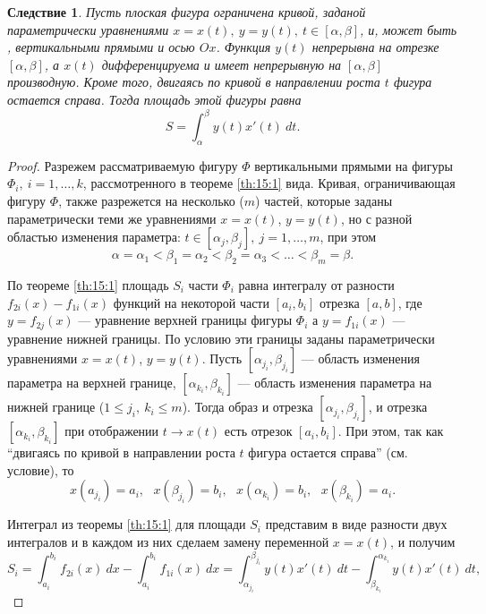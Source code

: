 \documentclass[12pt]{report}
\numberwithin{equation}{section}
\newtheorem{remark}{Следствие}[section]
\begin{document}
\begin{remark} \label {rem:15:1}
Пусть плоская фигура ограничена кривой, заданой параметрически уравнениями $x = x(t),~y = y(t),~t \in [\alpha, \beta]$, и, может быть , вертикальными прямыми и осью $Ox$. Функция $y(t)$ непрерывна на отрезке $[\alpha, \beta]$, а $x(t)$ дифференцируема и имеет непрерывную на $[\alpha, \beta]$ производную. Кроме того, двигаясь по кривой в направлении роста $t$ фигура остается справа. Тогда площадь этой фигуры равна
\[ S = \int_{\alpha}^{\beta} y(t) x'(t)~dt.\]
\end{remark}

\begin{proof}
Разрежем рассматриваемую фигуру $\Phi$ вертикальными прямыми на фигуры $\Phi_i,~i = 1,\ldots, k$, рассмотренного в теореме \ref{th:15:1} вида. Кривая, ограничивающая фигуру $\Phi$, также разрежется на несколько ($m$) частей, которые заданы параметрически теми же уравнениями $x = x(t)$, $y = y(t)$, но с разной областью изменения параметра: $t \in [\alpha_j, \beta_j],~j = 1,\ldots, m$, при этом
\[\alpha = \alpha_1 < \beta_1 = \alpha_2 < \beta_2 = \alpha_3  < \ldots < \beta_m = \beta. \]

По теореме \ref{th:15:1} площадь $S_i$ части $\Phi_i$ равна интегралу от разности $f_{2i}(x) - f_{1i}(x)$ функций на некоторой части $[a_i, b_i]$ отрезка $[a, b]$, где $y = f_{2j}(x)$ --- уравнение верхней границы фигуры $\Phi_i$ а $y = f_{1i}(x)$ --- уравнение нижней границы. По условию эти границы заданы параметрически уравнениями $x = x(t)$, $y = y(t)$. Пусть $[\alpha_{j_i}, \beta_{j_i}]$ --- область изменения параметра на верхней границе, $[\alpha_{k_i}, \beta_{k_i}]$ --- область изменения параметра на нижней границе ($1 \leqslant j_i,~k_i \leqslant m$). Тогда образ и отрезка $[\alpha_{j_i}, \beta_{j_i}]$, и отрезка $[\alpha_{k_i}, \beta_{k_i}]$ при отображении $t \to x(t)$ есть отрезок $[a_i, b_i]$. При этом, так как ``двигаясь по кривой в направлении роста $t$ фигура остается справа'' (см. условие), то
\begin{equation} \label{eq:15:1}
x(a_{j_i}) = a_i,~~~x(\beta_{j_i}) = b_i,~~~x(\alpha_{k_i}) = b_i,~~~x(\beta_{k_i}) = a_i.
\end{equation}

Интеграл из теоремы \ref{th:15:1} для площади $S_i$ представим в виде разности двух интегралов и в каждом из них сделаем замену переменной $x = x(t)$, и получим
\[ S_i = \int_{a_i}^{b_i} f_{2i} (x) ~dx - \int_{a_i}^{b_i} f_{1i}(x)~dx = \int_{\alpha_{j_i}}^{\beta_{j_i}} y(t) x'(t)~dt - \int_{\beta_{k_i}}^{\alpha_{k_i}} y(t) x'(t)~dt,\]


\end{proof}
\end{document}
